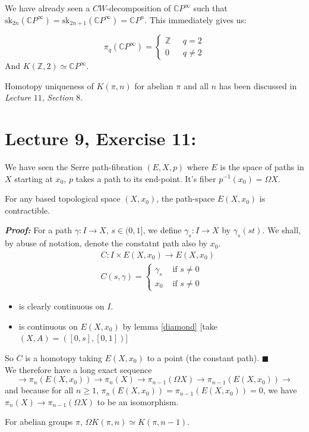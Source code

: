 \documentclass[11pt]{article}
\numberwithin{equation}{section}
\begin{document}
We have already seen a $CW$-decomposition of $\mathbb{C}P^{\infty}$ such that $\text{sk}_{2n}(\mathbb{C}P^{\infty})=\text{sk}_{2n+1}(\mathbb{C}P^{\infty}) = \mathbb{C}P^n$. This immediately gives us: 
\begin{cor}
$$\pi_q(\mathbb{C}P^{\infty})= 
\begin{cases}
\mathbb{Z}& \ \ \ q=2 \\ 
0& \ \ \ q\neq 2
\end{cases}
$$
And $K(\mathbb{Z},2) \simeq \mathbb{C}P^{\infty}$.
\end{cor}
\begin{rem}
Homotopy uniqueness of $K(\pi, n)$ for abelian $\pi$ and all $n$ has been discussed in \emph{Lecture} $11$, \emph{Section} $8$.
\end{rem}

\section{\normalsize{Lecture 9, Exercise 11:}}
We have seen the Serre path-fibration $(E,X,p)$ where $E$ is the space of paths in $X$ starting at $x_0$, $p$ takes a path to its end-point. It's fiber $p^{-1}(x_0)=\Omega X$. 
\begin{lem}
For any based topological space $(X, x_0)$, the path-space $E(X,x_0)$ is contractible.
\end{lem}
\textbf{\emph{Proof:}} For a path $\gamma:I\rightarrow X$, $s\in(0,1]$, we define $\gamma_s:I\rightarrow X $ by $\gamma_s\left(st\right)$. We shall, by abuse of notation, denote the constatnt path also by $x_0$. 
\begin{align*}
 &C: I\times E(X,x_0) \rightarrow E(X,x_0)\\ &C(s,\gamma)=
 \begin{cases} \gamma_s &\text{ if } s\neq 0 \\ x_0 &\text{ if } s\neq 0 \end{cases}
\end{align*}
\begin{itemize}
\item is clearly continuous on $I$. 
\item is continuous on $E(X,x_0)$ by lemma \ref{diamond} [take $(X,A)=([0,s],[0,1])$]
\end{itemize}
So $C$ is a homotopy taking $E(X,x_0)$ to a point (the constant path). $\blacksquare$ \\[8pt]
We therefore have a long exact sequence 
$$\rightarrow \pi_n(E(X,x_0))\rightarrow \pi_n(X)\rightarrow \pi_{n-1}(\Omega X) \rightarrow \pi_{n-1}(E(X,x_0))\rightarrow$$
and because for all $n\geqslant1$, $\pi_{n}(E(X,x_0))=\pi_{n-1}(E(X,x_0))=0$, we have $\pi_n(X)\rightarrow \pi_{n-1}(\Omega X)$ to be an isomorphism. 
\begin{cor}
For abelian groups $\pi$, $\Omega K(\pi,n)\simeq K(\pi,n-1)$.
\end{cor}
\end{document}
